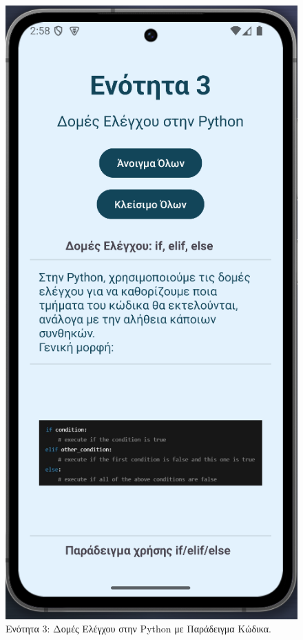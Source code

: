 \documentclass[11pt]{report}
\begin{document}
\begin{figure}[H]
  \centering
  \includegraphics[width=0.9\linewidth, height=0.35\textheight, keepaspectratio]{Figures/s5.png}
  \caption{Ενότητα 3: Δομές Ελέγχου στην Python με Παράδειγμα Κώδικα.}
\end{figure}
\end{document}
